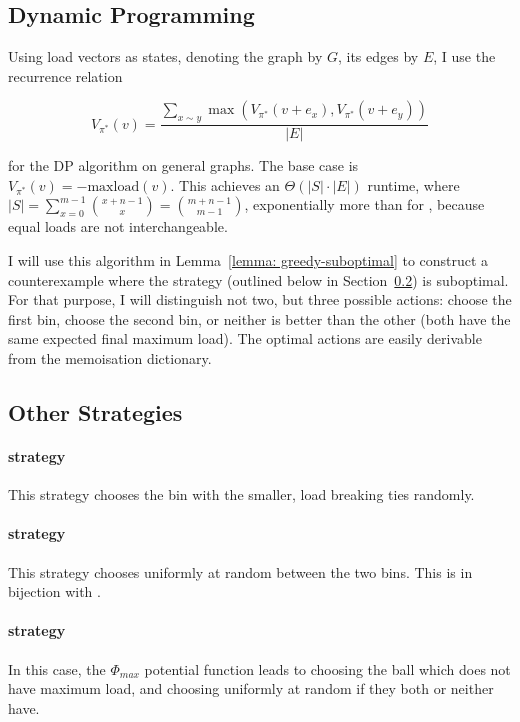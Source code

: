 \subsection{Dynamic Programming} \label{graphical-two-choice-dp}

Using load vectors as states, denoting the graph by $G$, its edges by $E$, I use the recurrence relation


\begin{equation} \label{eq:graphicaltwochoice-dynamicprogramming}
    V_{\pi^*}(v) = \frac{\sum_{x\sim y}\max (V_{\pi^*}(v+e_x), V_{\pi^*}(v+e_y))}{|E|}
\end{equation}

for the DP algorithm on general graphs. The base case is $V_{\pi^*}(v)=-\mathrm{maxload}(v)$. This achieves an $\Theta(|S|\cdot |E|)$ runtime, where $|S| = \sum_{x=0}^{m-1} {{x+n-1} \choose {x}} = {{m+n-1} \choose {m-1}}$, exponentially more than for \TwoThinning, because equal loads are not interchangeable.

I will use this algorithm in Lemma~\ref{lemma: greedy-suboptimal} to construct a counterexample where the \Greedy strategy (outlined below in Section~\ref{graphical-two-choice-otherstrategies}) is suboptimal. For that purpose, I will distinguish not two, but three possible actions: choose the first bin, choose the second bin, or neither is better than the other (both have the same expected final maximum load). The optimal actions are easily derivable from the memoisation dictionary.


\subsection{Other Strategies} \label{graphical-two-choice-otherstrategies}


\paragraph{\Greedy strategy} This strategy chooses the bin with the smaller, load breaking ties randomly.


\paragraph{\Random strategy} This strategy chooses uniformly at random between the two bins. This is in bijection with \OneChoice.


\paragraph{\LocalRewardOptimiser strategy} In this case, the $\Phi_{max}$ potential function leads to choosing the ball which does not have maximum load, and choosing uniformly at random if they both or neither have.


